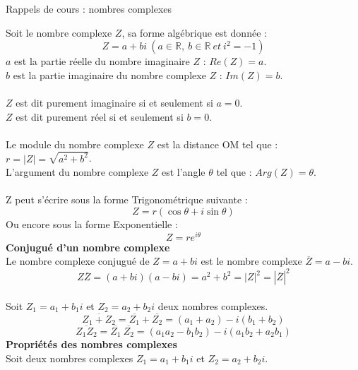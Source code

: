 \documentclass[12pt, a4paper]{article}
\begin{document}
\begin{center}
\large\sc 
Rappels de cours : nombres complexes
\end{center}
Soit le nombre complexe $Z$, sa forme algébrique est donnée :
\begin{equation*}
Z = a + bi~(a \in \mathbb{R}, ~ b \in \mathbb{R} ~ et ~ i^2=-1)
\end{equation*}
$a$ est la partie réelle du nombre imaginaire $Z$ : $Re(Z)=a$.
\\
$b$ est la partie imaginaire du nombre complexe $Z$ : $Im(Z)=b$.
\\
\\
$Z$ est dit purement imaginaire si et seulement si $a=0$.
\\
$Z$ est dit purement réel si et seulement si $b=0$.
\\
\\
Le module du nombre complexe $Z$ est la distance OM tel que : $r=|Z|=\sqrt{a^2+b^2}$.\\
L'argument du nombre complexe $Z$ est l'angle $\theta$ tel que : $Arg(Z)=\theta$.
\\
\\
Z peut s'écrire sous la forme Trigonométrique suivante :
\begin{equation*}
Z = r(\cos \theta+i\sin \theta)
\end{equation*}
Ou encore sous la forme Exponentielle :
\begin{equation*}
Z = re^{i\theta}
\end{equation*}
{\bf Conjugué d'un nombre complexe}
\\
Le nombre complexe conjugué de $Z=a+bi$ est le nombre complexe $\overline{Z}=a-bi$.
\begin{equation*}
Z\overline{Z} = (a+bi)(a-bi) = a^2+b^2 = |Z|^2= |\overline{Z}|^2
\end{equation*}\\
Soit $Z_{1} = a_{1}+b_{1}i$ et $Z_{2} = a_{2}+b_{2}i$ deux nombres complexes.
\begin{equation*}
\overline{Z_{1}+Z_{2}}=\overline{Z_{1}}+\overline{Z_{2}}=(a_{1}+a_{2})-i(b_{1}+b_{2})
\end{equation*}
\begin{equation*}
\overline{Z_{1} Z_{2}}=\overline{Z_{1}}~\overline{Z_{2}}=(a_{1}a_{2}-b_{1}b_{2})-i(a_{1}b_{2}+a_{2}b_{1})
\end{equation*}
{\bf Propriétés des nombres complexes}
\\
Soit deux nombres complexes $Z_{1} = a_{1}+b_{1}i$ et $Z_{2} = a_{2}+b_{2}i$.
\end{document}
